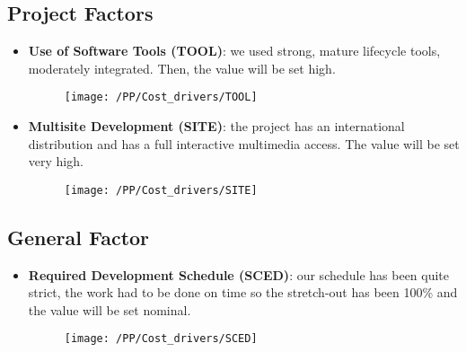 \subsection{Project Factors}
\begin{itemize}
    \item \textbf{Use of Software Tools (TOOL)}: we used strong, mature lifecycle tools, moderately integrated. Then, the value will be set high.
     \begin{figure}[!ht]
      \centering
      \vspace{0.2cm}
      \texttt{[image: /PP/Cost\_drivers/TOOL]}\\
      \vspace{0.2cm}
      \label{fig:TOOL} 
    \end{figure}  
    \item \textbf{Multisite Development (SITE)}: the project has an international distribution and has a full interactive multimedia access. The value will be set very high. 
     \begin{figure}[!ht]
      \centering
      \vspace{0.2cm}
      \texttt{[image: /PP/Cost\_drivers/SITE]}\\
      \vspace{0.2cm}
      \label{fig:SITE} 
    \end{figure}  
\end{itemize}

\subsection{General Factor}
\begin{itemize}
    \item \textbf{Required Development Schedule (SCED)}: our schedule has been quite strict, the work had to be done on time so the stretch-out has been 100\% and the value will be set nominal.
    \begin{figure}[!ht]
      \centering
      \vspace{0.2cm}
      \texttt{[image: /PP/Cost\_drivers/SCED]}\\
      \vspace{0.2cm}
      \label{fig:SCED} 
    \end{figure}
\end{itemize}


